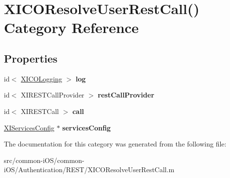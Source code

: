 \hypertarget{category_x_i_c_o_resolve_user_rest_call_07_08}{}\section{X\+I\+C\+O\+Resolve\+User\+Rest\+Call() Category Reference}
\label{category_x_i_c_o_resolve_user_rest_call_07_08}
\subsection*{Properties}
\begin{DoxyCompactItemize}
\item 
\hypertarget{category_x_i_c_o_resolve_user_rest_call_07_08_a090992fc1bd3a2ae0cceb2c4524ebae4}{}\label{category_x_i_c_o_resolve_user_rest_call_07_08_a090992fc1bd3a2ae0cceb2c4524ebae4} 
id$<$ \hyperlink{protocol_x_i_c_o_logging-p}{X\+I\+C\+O\+Logging} $>$ {\bfseries log}
\item 
\hypertarget{category_x_i_c_o_resolve_user_rest_call_07_08_a0fc9e3edbc7f07eb2ae2d8b7052a2bfb}{}\label{category_x_i_c_o_resolve_user_rest_call_07_08_a0fc9e3edbc7f07eb2ae2d8b7052a2bfb} 
id$<$ X\+I\+R\+E\+S\+T\+Call\+Provider $>$ {\bfseries rest\+Call\+Provider}
\item 
\hypertarget{category_x_i_c_o_resolve_user_rest_call_07_08_a6a8bcabcdcd0e921e28b575ae194e794}{}\label{category_x_i_c_o_resolve_user_rest_call_07_08_a6a8bcabcdcd0e921e28b575ae194e794} 
id$<$ X\+I\+R\+E\+S\+T\+Call $>$ {\bfseries call}
\item 
\hypertarget{category_x_i_c_o_resolve_user_rest_call_07_08_a5f8efc3416b174b25a676351a66a5e0d}{}\label{category_x_i_c_o_resolve_user_rest_call_07_08_a5f8efc3416b174b25a676351a66a5e0d} 
\hyperlink{interface_x_i_services_config}{X\+I\+Services\+Config} $\ast$ {\bfseries services\+Config}
\end{DoxyCompactItemize}


The documentation for this category was generated from the following file\+:\begin{DoxyCompactItemize}
\item 
src/common-\/i\+O\+S/common-\/i\+O\+S/\+Authentication/\+R\+E\+S\+T/X\+I\+C\+O\+Resolve\+User\+Rest\+Call.\+m\end{DoxyCompactItemize}
